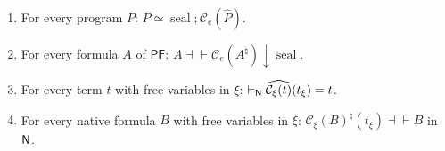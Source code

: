 \begin{lemma}
\label{base:lem:pf-rt}
\begin{enumerate}[label=\textup{(\roman*)}]
\item For every program $P$:
 $P\simeq\operatorname{seal};\mathcal C_e(\widehat P)$.
\item For every formula $A$ of $\mathsf{PF}$:
 $A\dashv\vdash\mathcal C_e(A^\natural){\downarrow}\operatorname{seal}$.
\item For every term $t$ with free variables in $\xi$:
 $\vdash_{\mathsf{N}}\widehat{\mathcal C_\xi(t)}(t_\xi)=t$.
\item For every native formula $B$ with free variables in $\xi$:
 $\mathcal C_\xi(B)^\natural(t_\xi)\dashv\vdash B$ in $\mathsf{N}$.
\end{enumerate}
\end{lemma}

